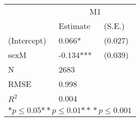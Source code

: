 \begin{tabular}{*{3}{l}}
\hline
                  & \multicolumn{2}{c}{M1}   \tabularnewline
                   &Estimate  &(S.E.)  \tabularnewline
 \hline
 \hline
   (Intercept)     &0.066*   &   (0.027) \tabularnewline
   sexM            &-0.134***   &   (0.039) \tabularnewline
 \hline
 N                 &2683       &        \tabularnewline
 RMSE             &0.998         & \tabularnewline
 $R^2$             &0.004         & \tabularnewline
 \hline
\hline
 
 \multicolumn{3}{c}{${*  p}\le 0.05$${*\!\!*  p}\le 0.01$${*\!\!*\!\!*  p}\le 0.001$}\tabularnewline
 \end{tabular}